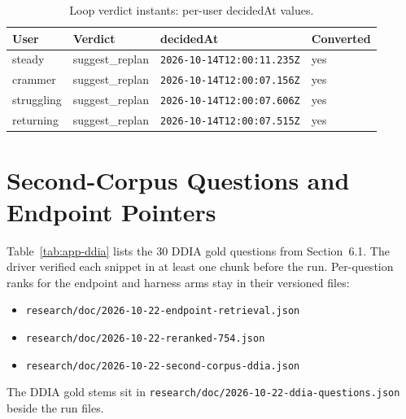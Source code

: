 \begin{table}[htbp]
\centering
\footnotesize
\caption{Loop verdict instants: per-user decidedAt values.}
\label{tab:app-decided}
\begin{tabular}{l l l l}
\toprule
\textbf{User} & \textbf{Verdict} & \textbf{decidedAt} & \textbf{Converted} \\
\midrule
steady & suggest\_replan & \texttt{2026-10-14T12:00:11.235Z} & yes \\
crammer & suggest\_replan & \texttt{2026-10-14T12:00:07.156Z} & yes \\
struggling & suggest\_replan & \texttt{2026-10-14T12:00:07.606Z} & yes \\
returning & suggest\_replan & \texttt{2026-10-14T12:00:07.515Z} & yes \\
\bottomrule
\end{tabular}
\end{table}

\section{Second-Corpus Questions and Endpoint Pointers}
Table~\ref{tab:app-ddia} lists the 30 DDIA gold questions from Section~6.1. The driver verified each snippet in at least one chunk before the run. Per-question ranks for the endpoint and harness arms stay in their versioned files:
\begin{itemize}[nosep,leftmargin=*]
\item \texttt{research/doc/2026-10-22-endpoint-retrieval.json}
\item \texttt{research/doc/2026-10-22-reranked-754.json}
\item \texttt{research/doc/2026-10-22-second-corpus-ddia.json}
\end{itemize}
The DDIA gold stems sit in \texttt{research/doc/2026-10-22-ddia-questions.json} beside the run files.

